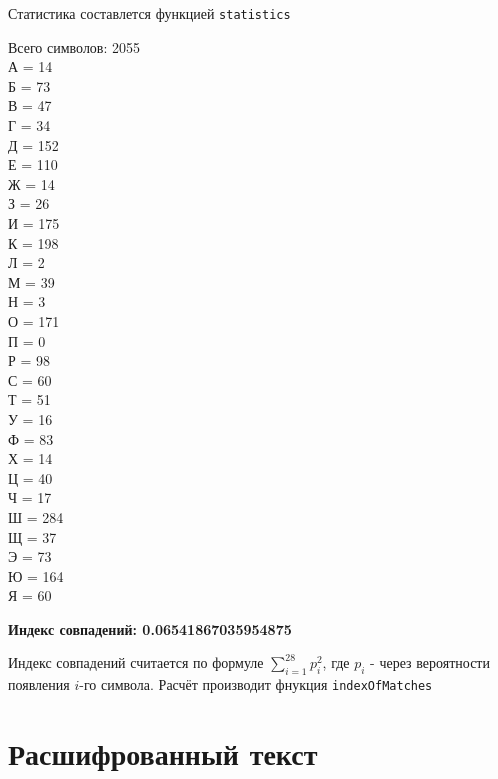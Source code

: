 \documentclass[a4paper, 14pt]{extarticle}
\begin{document}
Статистика составлется функцией \texttt{statistics}

\noindent
Всего символов: 2055
\\А = 14
\\Б = 73
\\В = 47
\\Г = 34
\\Д = 152
\\Е = 110
\\Ж = 14
\\З = 26
\\И = 175
\\К = 198
\\Л = 2
\\М = 39
\\Н = 3
\\О = 171
\\П = 0
\\Р = 98
\\С = 60
\\Т = 51
\\У = 16
\\Ф = 83
\\Х = 14
\\Ц = 40
\\Ч = 17
\\Ш = 284
\\Щ = 37
\\Э = 73
\\Ю = 164
\\Я = 60

\textbf{Индекс совпадений: 0.06541867035954875}

Индекс совпадений считается по формуле $\sum^{28}_{i=1} p_i^2$, где $p_i$ - через вероятности появления $i$-го символа. Расчёт производит фнукция \texttt{indexOfMatches}\\


\section{Расшифрованный текст}
\end{document}
